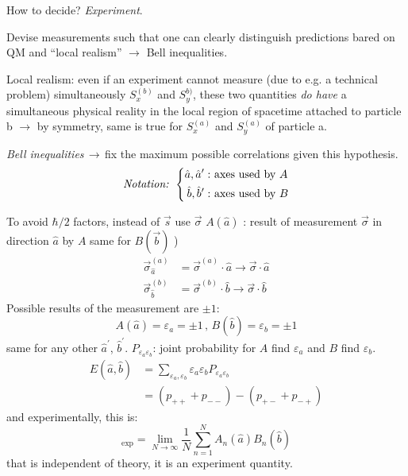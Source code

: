 \documentclass[12pt]{article}
\newcommand{\be}{\begin{equation}}
\newcommand{\ee}{\end{equation}}
\begin{document}
How to decide? \emph{Experiment}.

Devise measurements such that one can
clearly distinguish predictions bared on QM
and ``local realism'' $\to$ Bell inequalities.


Local realism: even if an experiment cannot
measure (due to e.g. a technical problem)
simultaneously \(S_{x}^{(b)}\) and \(S_{y}^{b)}\), these two
quantities \emph{do have} a simultaneous physical
reality in the local region of spacetime
attached to particle b $\rightarrow$
by symmetry, same is true
for \(S_{x}^{(a)}\) and \(S_{y}^{(a)}\) of particle a.

\emph{Bell inequalities}\,$\rightarrow$\,fix the maximum possible
correlations given this hypothesis.
\[
\text{\emph{Notation:} }
\left\{
\begin{aligned}
\hat{a}, \hat{a}^\prime:&\text{ axes used by } A\\
\hat{b}, \hat{b}^\prime:&\text{ axes used by } B
\end{aligned}
\right.
\]

To avoid \(\hbar / 2\) factors, instead of \(\vec{s}\) use \(\vec{\sigma}\)
\(A(\hat{a})\) : result of measurement \(\vec{\sigma}\) in direction \(\hat{a}\) by \(A\)
same for \(B(\vec{b})\) )
\be
\begin{aligned}
\vec{\sigma}^{(a)}_{\hat{a}}&=
\vec{\sigma}^{(a)} \cdot \hat{a} \rightarrow \vec{\sigma} \cdot \hat{a}\\
\vec{\sigma}^{(b)}_{\hat{b}}&=
\vec{\sigma}^{(b)} \cdot \hat{b} \rightarrow \vec{\sigma} \cdot \hat{b}
\end{aligned}
\ee
Possible results of the measurement are $\pm1$:
\be
A(\hat{a})=\varepsilon_{a}=\pm 1\,,\,B(\hat{b})=\varepsilon_{b}=\pm 1
\ee
same for any other $\hat{a}^\prime$, $\hat{b}^\prime$.
$P_{\varepsilon_a \varepsilon_b}$: joint probability for $A$ find $\varepsilon_a$ and $B$ find $\varepsilon_b$.
\be
\begin{aligned} 
E(\hat{a}, \hat{b}) 
&=\sum_{\varepsilon_{a}, \varepsilon_{b}} \varepsilon_{a} \varepsilon_{b} P_{\varepsilon_{a} \varepsilon_{b}} \\ 
&=\left(p_{++}+p_{--}\right)-\left(p_{+-}+p_{-+}\right)
\end{aligned}
\label{eq:g86}
\ee
and experimentally, this is:
\be
[E(\hat{a}, \hat{b})]_{\text{exp}}=\lim _{N \rightarrow \infty} \frac{1}{N} \sum_{n=1}^{N} A_{n}(\hat{a}) B_{n}(\hat{b})
\ee
that is independent of theory, it is an experiment quantity.
\end{document}
